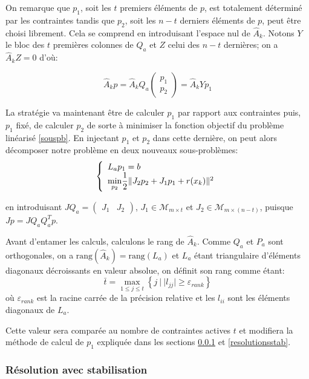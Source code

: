 \documentclass[a4paper,11pt]{article}
\newcommand{\ha}{\hat{A}}
\numberwithin{equation}{section}
\begin{document}
On remarque que $p_{1}$, soit les $t$ premiers éléments de $p$, est totalement déterminé par les contraintes tandis que $p_{2}$, soit les $n-t$ derniers éléments de $p$, peut être choisi librement. Cela se comprend en introduisant l'espace nul de $\ha_{k}$. Notons $Y$ le bloc des $t$ premières colonnes de $Q_{a}$ et $Z$ celui des $n-t$ dernières;  on a $\ha_{k}Z=0$ d'où:

$$
\ha_{k}p = \ha_{k}Q_{a} \begin{pmatrix}
p_{1}\\p_{2}
\end{pmatrix}=\ha_{k}Yp_{1}
$$

La stratégie va maintenant être de calculer $p_{1}$ par rapport aux contraintes puis, $p_{1}$ fixé, de calculer $p_{2}$ de sorte à minimiser la fonction objectif du problème linéarisé \eqref{souspb}. En injectant $p_{1}$ et $p_{2}$ dans cette dernière, on peut alors décomposer notre problème en deux nouveaux sous-problèmes:
\[
\left\{
\begin{array}{l l}
L_{a}p_{1} = b \\
\underset{p_{2}}{\min} \dfrac{1}{2}\|J_{2}p_{2} + J_{1}p_{1} + r(x_{k})\|^{2}
\end{array}\right.
\]

en introduisant $JQ_{a} = \begin{pmatrix}
J_{1} & J_{2}
\end{pmatrix}$, $J_{1} \in \mathcal{M}_{m\times t}$ et $J_{2} \in \mathcal{M}_{m\times (n-t)}$, puisque $Jp=JQ_{a}Q_{a}^{T}p$.

Avant d'entamer les calculs, calculons le rang de $\ha_{k}$. Comme $Q_{a}$ et $P_{a}$ sont orthogonales, on a $\text{rang}(\ha_{k})=\text{rang}(L_{a})$ et $L_{a}$ étant triangulaire d'éléments diagonaux décroissants en valeur absolue, on définit son rang comme étant:
\begin{equation} \label{tbar}
\bar{t} = \underset{1\leq j\leq t}{\max} \left\{ j\ | \ |l_{jj}| \geq \varepsilon_{rank}\right\}
\end{equation} où $\varepsilon_{rank}$ est la racine carrée de la précision relative et les $l_{ii}$ sont les éléments diagonaux de $L_{a}$.

Cette valeur sera comparée au nombre de contraintes actives $t$ et modifiera la méthode de calcul de $p_{1}$ expliquée dans les sections \ref{resolutionavecstab} et \ref{resolutionsstab}.

\subsubsection{Résolution avec stabilisation} \label{resolutionavecstab}
\end{document}
